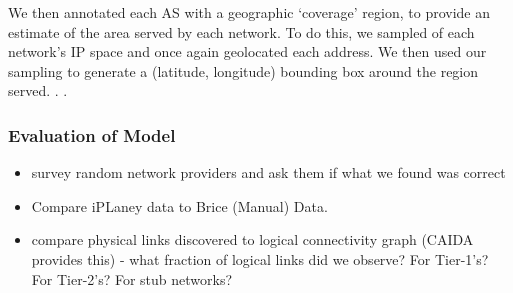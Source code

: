     We then annotated each AS with a geographic `coverage' region, to provide
an estimate of the area served by each network. 
    To do this, we sampled  of each network's IP space and
once again geolocated each address. 
    We then used our sampling to generate a (latitude, longitude) bounding box
around the region served.    
    .
    .
 
        \subsubsection*{Evaluation of Model}
            \begin{itemize}
        \item survey random network providers and ask them if what we
        found was correct
        \item Compare iPLaney data to Brice (Manual) Data.
        \item compare physical links discovered to logical connectivity
        graph (CAIDA provides this) - what fraction of logical links
        did we observe? For Tier-1's? For Tier-2's? For stub networks?
            \end{itemize} 


